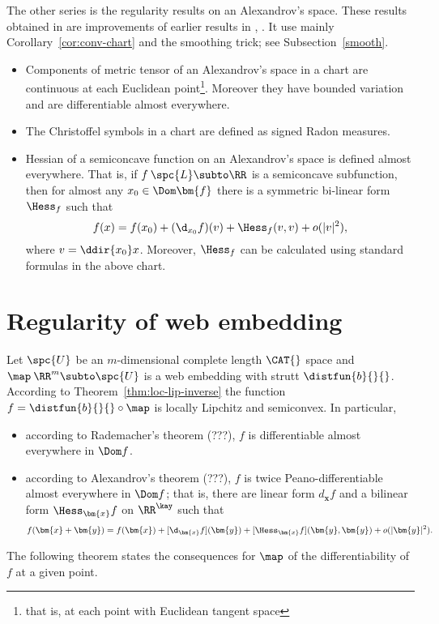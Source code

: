 The other series is the regularity results on an Alexandrov's space. 
These results obtained in \cite{perelman:DC} are improvements of earlier results in \cite{otsu-shioya}, \cite{otsu:second-der}. 
It use mainly
Corollary~\ref{cor:conv-chart} and the smoothing trick; see Subsection~\ref{smooth}. 
\begin{itemize}
\item Components of metric tensor of an Alexandrov's space in a chart are continuous
at each Euclidean point\footnote{that is, at each point with Euclidean tangent
space}. 
Moreover they have bounded variation and are differentiable almost everywhere.
\item The Christoffel symbols  in a chart are defined as signed Radon measures.
\item Hessian of a semiconcave function on an Alexandrov's space is defined almost
everywhere. 
That is, if $f\:\spc{L}\subto\RR$ is a semiconcave subfunction, then for almost
any $x_0\in \Dom\bm{f}$ there is a symmetric bi-linear form $\Hess_f$ such that
\[f(x)=f(x_0)+(\d_{x_0}f)(v)+\Hess_f(v,v)+o(|v|^2),\]
where $v=\ddir{x_0}x$. 
Moreover, $\Hess_f$ can be calculated using  standard formulas in the above
chart.
\end{itemize}








\section{Regularity of web embedding}\label{sec:web-embedding}

Let $\spc{U}$ be an $m$-dimensional complete length $\CAT{}$ space
and $\map\:\RR^m\subto \spc{U}$ is a web embedding with strutt
$\distfun{b}{}{}$.
According to Theorem~\ref{thm:loc-lip-inverse} the function $f=\distfun{b}{}{}\circ\map$ is locally Lipchitz and semiconvex.
In particular, 
\begin{itemize}
\item according to Rademacher's theorem (???), $f$ is differentiable almost everywhere in $\Dom f$.
\item according to Alexandrov's theorem (???), 
$f$ is twice Peano-differentiable almost everywhere in $\Dom f$;
that is, there are 
linear form $d_{\bm{x}}f$ 
and a bilinear form $\Hess_{\bm{x}}f$ 
on $\RR^\kay$ 
such that
\[f(\bm{x}+\bm{y})
=
f(\bm{x})+[\d_{\bm{x}}f](\bm{y})+[\Hess_{\bm{x}}f](\bm{y},\bm{y})
+o(|\bm{y}|^2).\] 
\end{itemize}
The following theorem states the consequences for $\map$ 
of the differentiability of $f$ at a given point. 


